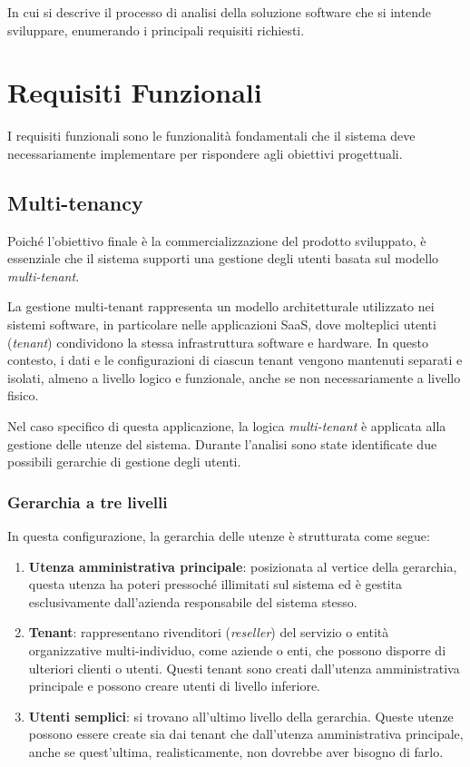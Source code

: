 In cui si descrive il processo di analisi della soluzione software che si intende sviluppare, enumerando i principali requisiti richiesti.

\section{Requisiti Funzionali}
I requisiti funzionali sono le funzionalità fondamentali che il sistema deve necessariamente implementare per rispondere agli obiettivi progettuali.

\subsection{Multi-tenancy}
Poiché l'obiettivo finale è la commercializzazione del prodotto sviluppato, è essenziale che il sistema supporti una gestione degli utenti basata sul modello \emph{multi-tenant}.

La gestione multi-tenant rappresenta un modello architetturale utilizzato nei sistemi software, in particolare nelle applicazioni SaaS, dove molteplici utenti (\emph{tenant}) condividono la stessa infrastruttura software e hardware. In questo contesto, i dati e le configurazioni di ciascun tenant vengono mantenuti separati e isolati, almeno a livello logico e funzionale, anche se non necessariamente a livello fisico.

Nel caso specifico di questa applicazione, la logica \emph{multi-tenant} è applicata alla gestione delle utenze del sistema. Durante l'analisi sono state identificate due possibili gerarchie di gestione degli utenti.

\subsubsection{Gerarchia a tre livelli}
\label{3-level}
In questa configurazione, la gerarchia delle utenze è strutturata come segue:

\begin{enumerate}
    \item \textbf{Utenza amministrativa principale}: posizionata al vertice della gerarchia, questa utenza ha poteri pressoché illimitati sul sistema ed è gestita esclusivamente dall'azienda responsabile del sistema stesso.
    \item \textbf{Tenant}: rappresentano rivenditori (\emph{reseller}) del servizio o entità organizzative multi-individuo, come aziende o enti, che possono disporre di ulteriori clienti o utenti. Questi tenant sono creati dall'utenza amministrativa principale e possono creare utenti di livello inferiore.
    \item \textbf{Utenti semplici}: si trovano all'ultimo livello della gerarchia. Queste utenze possono essere create sia dai tenant che dall'utenza amministrativa principale, anche se quest'ultima, realisticamente, non dovrebbe aver bisogno di farlo.
\end{enumerate}

